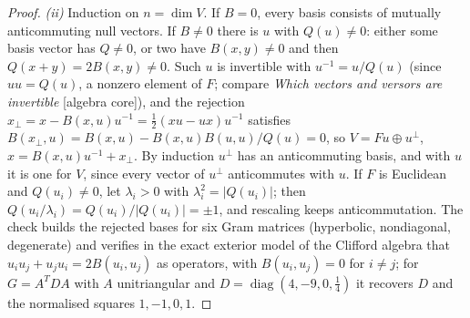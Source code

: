 \documentclass[11pt]{article}
\theoremstyle{definition}
\theoremstyle{plain}
\begin{document}
\begin{proof}
\emph{(ii)} Induction on $n = \dim V$. If $B = 0$, every basis consists of mutually anticommuting null vectors. If $B \ne 0$ there is $u$ with $Q(u) \ne 0$: either some basis vector has $Q \ne 0$, or two have $B(x, y) \ne 0$ and then $Q(x + y) = 2B(x, y) \ne 0$. Such $u$ is invertible with $u^{-1} = u/Q(u)$ (since $uu = Q(u)$, a nonzero element of $F$; compare \emph{Which vectors and versors are invertible} [algebra core]), and the rejection $x_{\perp} = x - B(x, u)u^{-1} = \tfrac12(xu - ux)u^{-1}$ satisfies $B(x_{\perp}, u) = B(x, u) - B(x, u)B(u, u)/Q(u) = 0$, so $V = Fu \oplus u^{\perp}$, $x = B(x,u)u^{-1} + x_{\perp}$. By induction $u^{\perp}$ has an anticommuting basis, and with $u$ it is one for $V$, since every vector of $u^{\perp}$ anticommutes with $u$. If $F$ is Euclidean and $Q(u_{i}) \ne 0$, let $\lambda_{i} > 0$ with $\lambda_{i}^{2} = |Q(u_{i})|$; then $Q(u_{i}/\lambda_{i}) = Q(u_{i})/|Q(u_{i})| = \pm 1$, and rescaling keeps anticommutation. The check builds the rejected bases for six Gram matrices (hyperbolic, nondiagonal, degenerate) and verifies in the exact exterior model of the Clifford algebra that $u_{i}u_{j} + u_{j}u_{i} = 2B(u_{i}, u_{j})$ as operators, with $B(u_{i}, u_{j}) = 0$ for $i \ne j$; for $G = A^{T}DA$ with $A$ unitriangular and $D = \operatorname{diag}(4, -9, 0, \tfrac14)$ it recovers $D$ and the normalised squares $1, -1, 0, 1$.


\end{proof}
\end{document}
